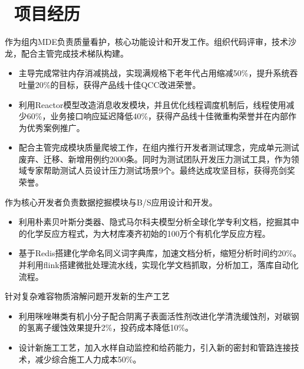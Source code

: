 \documentclass{resume}
\begin{document}



\section{\faBriefcase\ 项目经历}

\begin{onehalfspacing}
作为组内MDE负责质量看护，核心功能设计和开发工作。组织代码评审，技术沙龙，配合主管完成技术梯队构建。
\begin{itemize}
  \item 主导完成常驻内存消减挑战，实现满规格下老年代占用缩减50\%，提升系统吞吐量20\%的目标，获得产品线十佳QCC改进荣誉。
  \item 利用Reactor模型改造消息收发模块，并且优化线程调度机制后，线程使用减少60\%，业务接口响应延迟降低40\%，获得产品线十佳微重构荣誉并在内部作为优秀案例推广。
  \item 配合主管完成模块质量爬坡工作，在组内推行开发者测试理念，完成单元测试废弃、迁移、新增用例约2000条。同时为测试团队开发压力测试工具，作为领域专家帮助测试人员设计压力测试场景9个。最终达成攻坚目标，获得亮剑奖荣誉。
\end{itemize}
\end{onehalfspacing}

\begin{onehalfspacing}
作为核心开发者负责数据挖掘模块与B/S应用设计和开发。
\begin{itemize}
  \item 利用朴素贝叶斯分类器、隐式马尔科夫模型分析全球化学专利文档，挖掘其中的化学反应方程式，为大材库凑齐初始的100万个有机化学反应方程。
  \item 基于Redis搭建化学命名同义词字典库，加速文档分析，缩短分析时间约20\%。并利用flink搭建微批处理流水线，实现化学文档抓取，分析加工，落库自动化流程。
\end{itemize}
\end{onehalfspacing}

\begin{onehalfspacing}
针对复杂难容物质溶解问题开发新的生产工艺
\begin{itemize}
  \item 利用咪唑啉类有机小分子配合阴离子表面活性剂改进化学清洗缓蚀剂，对碳钢的氢离子缓蚀效果提升2\%，投药成本降低10\%。
  \item 设计新施工工艺，加入水样自动监控和给药能力，引入新的密封和管路连接技术，减少综合施工人力成本50\%。
\end{itemize}
\end{onehalfspacing}
\end{document}
